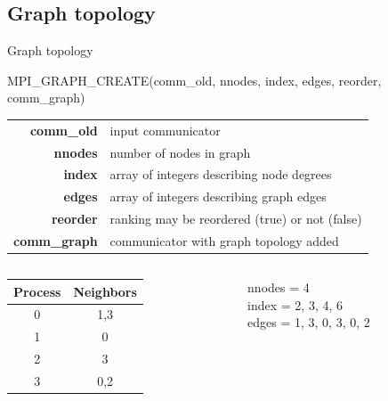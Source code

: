 \documentclass[aspectratio=43]{beamer}
\begin{document}
\subsection{Graph topology}
\begin{frame}[fragile]{Graph topology}
\begin{Fortranlisting}[]{}
MPI_GRAPH_CREATE(comm_old, nnodes, index, edges, reorder, comm_graph)
\end{Fortranlisting}
\begin{black1block}{}
\begin{tabular}{rp{8cm}}
\textbf{comm\_old} & input communicator\\
\textbf{nnodes} & number of nodes in graph\\
\textbf{index} & array of integers describing node degrees\\
\textbf{edges} & array of integers describing graph edges\\
\textbf{reorder} & ranking may be reordered (true) or not (false)\\
\textbf{comm\_graph} & communicator with graph topology added\\
\end{tabular}
\end{black1block}
\begin{columns}
\begin{column}{0.3\paperwidth}
\begin{tabular}{|c|c|}\hline
    Process & Neighbors\\\hline
    0 & 1,3\\\hline
    1 & 0\\\hline
    2 & 3\\\hline
    3 & 0,2\\\hline
\end{tabular}
\end{column}

\begin{column}{0.3\paperwidth}
\begin{black1block}{}
nnodes = 4\\
index = 2, 3, 4, 6\\
edges = 1, 3, 0, 3, 0, 2\\
\end{black1block}
\end{column}


\end{columns}
\end{frame}
\end{document}
